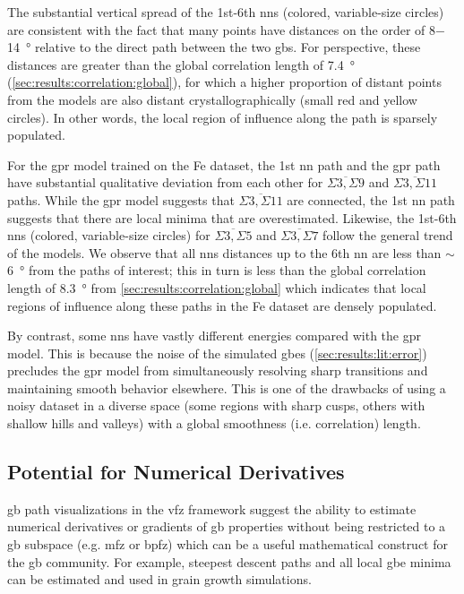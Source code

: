\documentclass[final,twocolumn,12pt]{elsarticle}
\begin{document}
     The substantial vertical spread of the 1st-6th \glspl{nn} (colored, variable-size circles) are consistent with the fact that many points have distances on the order of \num{8}$-$\SI{14}{\degree} relative to the direct path between the two \glspl{gb}. For perspective, these distances are greater than the global correlation length of \SI{7.4}{\degree} (\cref{sec:results:correlation:global}), for which a higher proportion of distant points from the models are also distant crystallographically (small red and yellow circles). In other words, the local region of influence along the path is sparsely populated.
     
     For the \gls{gpr} model trained on the Fe \citet{kimPhasefieldModeling3D2014} dataset, the 1st \gls{nn} path and the \gls{gpr} path have substantial qualitative deviation from each other for $\overline{\Sigma3,\Sigma9}$ and $\overline{\Sigma3,\Sigma11}$ paths. While the \gls{gpr} model suggests that $\overline{\Sigma3,\Sigma11}$ are connected, the 1st \gls{nn} path suggests that there are local minima that are overestimated. Likewise, the 1st-6th \glspl{nn} (colored, variable-size circles) for $\overline{\Sigma3,\Sigma5}$ and $\overline{\Sigma3,\Sigma7}$ follow the general trend of the models. We observe that all \glspl{nn} distances up to the 6th \gls{nn} are less than $\sim$\SI{6}{\degree} from the paths of interest; this in turn is less than the global correlation length of \SI{8.3}{\degree} from \cref{sec:results:correlation:global} which indicates that local regions of influence along these paths in the Fe dataset are densely populated.
     
     By contrast, some \glspl{nn} have vastly different energies compared with the \gls{gpr} model. This is because the noise of the simulated \glspl{gbe} (\cref{sec:results:lit:error}) precludes the \gls{gpr} model from simultaneously resolving sharp transitions and maintaining smooth behavior elsewhere. This is one of the drawbacks of using a noisy dataset in a diverse space (some regions with sharp cusps, others with shallow hills and valleys) with a global smoothness (i.e. correlation) length.
	
	\subsection{Potential for Numerical Derivatives}
	\label{sec:results:deriv}
	
	 \Gls{gb} path visualizations in the \gls{vfz} framework suggest the ability to estimate numerical derivatives or gradients of \gls{gb} properties without being restricted to a \gls{gb} subspace (e.g. \gls{mfz} or \gls{bpfz}) which can be a useful mathematical construct for the \gls{gb} community. For example, steepest descent paths and all local \gls{gbe} minima can be estimated and used in grain growth simulations.
	
\end{document}
